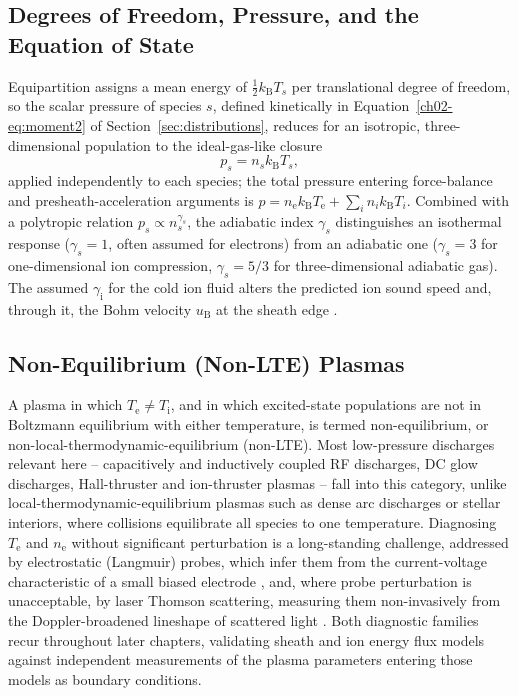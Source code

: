 \subsection{Degrees of Freedom, Pressure, and the Equation of State}

Equipartition assigns a mean energy of $\tfrac{1}{2} k_{\mathrm{B}} T_{s}$ per translational degree of freedom, so the scalar pressure of species $s$, defined kinetically in Equation~\eqref{ch02-eq:moment2} of Section~\ref{sec:distributions}, reduces for an isotropic, three-dimensional population to the ideal-gas-like closure
\begin{equation}
p_{s} = n_{s} k_{\mathrm{B}} T_{s},
\label{eq:equation-of-state}
\end{equation}
applied independently to each species; the total pressure entering force-balance and presheath-acceleration arguments is $p = n_{\mathrm{e}} k_{\mathrm{B}} T_{\mathrm{e}} + \sum_{i} n_{i} k_{\mathrm{B}} T_{i}$. Combined with a polytropic relation $p_{s} \propto n_{s}^{\gamma_{s}}$, the adiabatic index $\gamma_{s}$ distinguishes an isothermal response ($\gamma_{s}=1$, often assumed for electrons) from an adiabatic one ($\gamma_{s}=3$ for one-dimensional ion compression, $\gamma_{s}=5/3$ for three-dimensional adiabatic gas). The assumed $\gamma_{\mathrm{i}}$ for the cold ion fluid alters the predicted ion sound speed and, through it, the Bohm velocity $u_{\mathrm{B}}$ at the sheath edge \cite{ref0023}.

\subsection{Non-Equilibrium (Non-LTE) Plasmas}

A plasma in which $T_{\mathrm{e}} \neq T_{\mathrm{i}}$, and in which excited-state populations are not in Boltzmann equilibrium with either temperature, is termed non-equilibrium, or non-local-thermodynamic-equilibrium (non-LTE). Most low-pressure discharges relevant here -- capacitively and inductively coupled RF discharges, DC glow discharges, Hall-thruster and ion-thruster plasmas -- fall into this category, unlike local-thermodynamic-equilibrium plasmas such as dense arc discharges or stellar interiors, where collisions equilibrate all species to one temperature. Diagnosing $T_{\mathrm{e}}$ and $n_{\mathrm{e}}$ without significant perturbation is a long-standing challenge, addressed by electrostatic (Langmuir) probes, which infer them from the current-voltage characteristic of a small biased electrode \cite{ref0217,ref0194}, and, where probe perturbation is unacceptable, by laser Thomson scattering, measuring them non-invasively from the Doppler-broadened lineshape of scattered light \cite{ref0354,ref0384}. Both diagnostic families recur throughout later chapters, validating sheath and ion energy flux models against independent measurements of the plasma parameters entering those models as boundary conditions.

